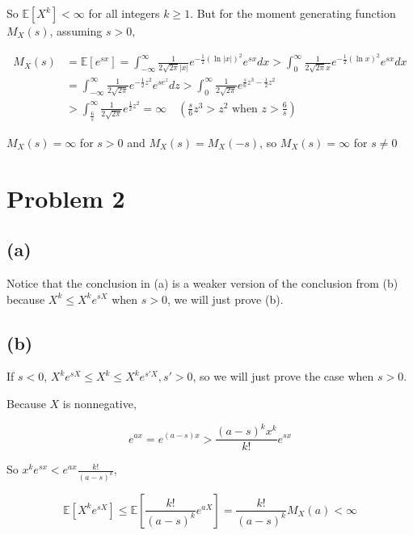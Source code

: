 \documentclass{article}
\begin{document}
So $\mathbb{E}[X^k] < \infty$ for all integers $k\geqslant 1$. But for the moment generating function $M_X(s)$, assuming $s>0$,

\begin{equation}
    \begin{aligned}
        M_X(s) & = \mathbb{E}[e^{sx}] = \int_{-\infty}^{\infty}  \frac{1}{2\sqrt{2\pi} |x|} e^{-\frac{1}{2} (\ln |x|)^2} e^{sx} dx > \int_{0}^{\infty}  \frac{1}{2\sqrt{2\pi} x} e^{-\frac{1}{2} (\ln x)^2} e^{sx} dx  \\
        & = \int_{-\infty}^{\infty}  \frac{1}{2\sqrt{2\pi} } e^{-\frac{1}{2} z^2} e^{se^z} dz > \int_{0}^{\infty} \frac{1}{2\sqrt{2\pi} } e^{\frac{s}{6} z^3-\frac{1}{2} z^2} \\
        & >  \int_{\frac{6}{s}}^{\infty} \frac{1}{2\sqrt{2\pi} } e^{\frac{1}{2} z^2} = \infty \quad (\frac{s}{6} z^3 > z^2 \text{ when } z>\frac{6}{s}) 
    \end{aligned}
\end{equation}

$M_X(s) = \infty$ for $s>0$ and $M_X(s) = M_X(-s)$, so  $M_X(s) = \infty$ for $s\neq 0$

\section{Problem 2}

\subsection{(a)}

Notice that the conclusion in (a) is a weaker version of the conclusion from (b) because $X^k \leqslant X^k e^{sX}$ when $s>0$, we will just prove (b).

\subsection{(b)}

If $s<0$, $X^k e^{sX} \leqslant X^k \leqslant X^k e^{s'X},s'>0$, so we will just prove the case when $s>0$.

Because $X$ is nonnegative,

\begin{equation}
    e^{ax} = e^{(a-s)x}  > \frac{(a-s)^k x^k}{k!}e^{sx}
\end{equation}

So $x^ke^{sx} < e^{ax} \frac {k!}{(a-s)^k}$,

\begin{equation}
    \mathbb{E}[X^ke^{sX}] \leqslant \mathbb{E}[\frac {k!}{(a-s)^k} e^{aX}] = \frac {k!}{(a-s)^k} M_X(a) < \infty
\end{equation}
\end{document}
